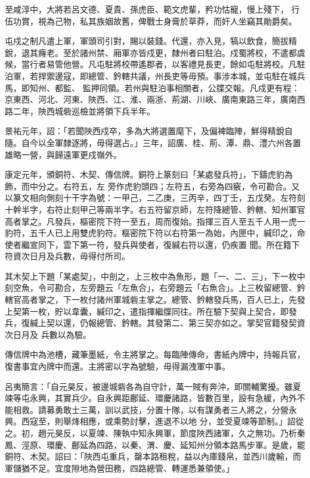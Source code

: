 \begin{pinyinscope}
 至咸淳中，大將若呂文德、夏貴、孫虎臣、範文虎輩，矜功怙寵，慢上殘下，
 行伍功賞，視為己物，私其族姻故舊，俾戰士身膏於草莽，而奸人坐竊其勛爵矣。



 屯戍之制凡遣上軍，軍頭司引對，賜以裝錢。代還，亦入見，犒以飲食，簡拔精銳，退其癃老。至於諸州禁、廂軍亦皆戍更，隸州者曰駐泊。戍蜀將校，不遣都虞候，當行者易管他營。凡屯駐將校帶遙郡者，以客禮見長吏，餘如屯駐將校。凡駐泊軍，若捍禦邊寇，即總管、鈐轄共議，州長吏等毋預。事涉本城，並屯駐在城兵馬，即知州、都監、
 監押同領。若州與駐泊事相關者，公牒交報。凡戍更有程：京東西、河北、河東、陜西、江、淮、兩浙、荊湖、川峽、廣南東路三年，廣南西路二年，陜西城砦巡檢並將領下兵半年。



 景祐元年，詔：「若聞陜西戍卒，多為大將選置麾下，及偏裨臨陣，鮮得精銳自隨。自今以全軍隸逐將，毋得選占。」三年，詔廣、桂、荊、潭、鼎、澧六州各置雄略一營，與歸遠軍更戍嶺外。



 康定元年，頒銅符、木契、傳信牌。銅符上篆刻曰「某處發兵符」，下鑄虎豹為飾，而中分之。右符五，左
 旁作虎豹頭四；左符五，右旁為四竅，令可勘合。又以篆文相向側刻十干字為號：一甲己，二乙庚，三丙辛，四丁壬，五戊癸。左符刻十幹半字，右符止刻甲己等兩半字。右五符留京師，左符降總管、鈐轄、知州軍官高者掌之。凡發兵，樞密院下符一至五，周而復始。指揮三百人至五千人用一虎一豹符，五千人已上用雙虎豹符。樞密院下符以右符第一為始，內匣中，緘印之，命使者繼宣同下，雲下第一符，發兵與使者，復緘右符以還，仍疾置
 聞。所在籍下符資次日月及兵數，毋得付所司。



 其木契上下題「某處契」，中剖之，上三枚中為魚形，題「一、二、三」，下一枚中刻空魚，令可勘合，左旁題云「左魚合」，右旁題云「右魚合」。上三枚留總管、鈐轄官高者掌之，下一枚付諸州軍城砦主掌之。總管、鈐轄發兵馬，百人已上，先發上契第一枚，貯以韋囊，緘印之，遣指揮繼牒同往。所在驗下契與上契合，即發兵，復緘上契以還，仍報總管、鈐轄。其發第二、第三契亦如之。掌契官籍發契資次日月及
 兵數以為驗。



 傳信牌中為池槽，藏筆墨紙，令主將掌之。每臨陣傳命，書紙內牌中，持報兵官，復書事宜內牌中而還。主將密以字為號驗，毋得漏洩軍中事。



 呂夷簡言：「自元昊反，被邊城砦各為自守計，萬一賊有奔沖，即關輔驚擾。雖夏竦等屯永興，其實兵少。自永興距鄜延、環慶諸路，皆數百里，設有急緩，內外不能相救。請募勇敢士三萬，訓以武技，分置十隊，以有謀勇者三人將之，分營永興。西寇至，則舉烽相應，或乘勢討擊，進退不以地
 分，並受夏竦等節制。」詔從之。初，趙元昊反，以夏竦、陳執中知永興軍，節度陜西諸軍，久之無功。乃析秦鳳、涇原、環慶、鄜延為四路，以秦、渭、慶、延知州分領本路馬步軍。是歲，罷銅符、木契。詔曰：「陜西屯重兵，罄本路租稅，益以內庫錢帛，並西川歲輸，而軍儲猶不足。宜度隙地為營田務，四路總管、轉運悉兼領使。」




\end{pinyinscope}
